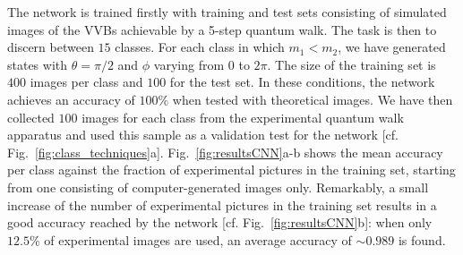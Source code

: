 The network is trained firstly with training and test sets consisting of simulated images of the \ac{VVB}s achievable by a 5-step quantum walk. The task is then to discern between $15$ classes. For each class in which $m_1 < m_2$, we have generated   states with $\theta=\pi/2$ and $\phi$ varying from $0$ to $2 \pi$. The size of the training set is $400$ images per class and $100$ for the test set. In these conditions, the network achieves an accuracy of $100\%$ when tested with theoretical images. 
We have then collected $100$ images for each class from the experimental quantum walk apparatus and used this sample as a validation test for the network [cf. Fig.~\ref{fig:class_techniques}a]. Fig.~\ref{fig:resultsCNN}a-b shows the mean accuracy per class against the fraction of experimental pictures in the training set, starting from one consisting of computer-generated images only.
Remarkably, a small increase of the number of experimental pictures in the training set results in a good accuracy reached by the network [cf. Fig.~\ref{fig:resultsCNN}b]: when only $12.5\%$ of experimental images are used, an average accuracy of $\sim 0.989$ is found.




